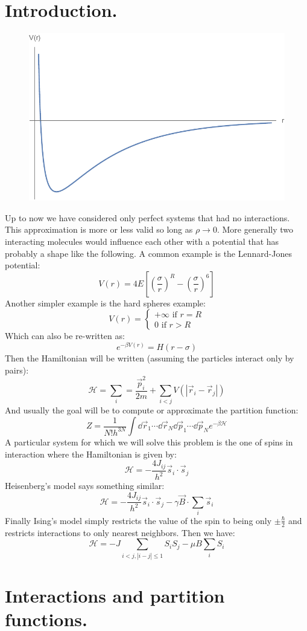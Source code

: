 \documentclass[10pt,a4paper]{book}
\begin{document}
\section{Introduction.}
\begin{figure}
\includegraphics[width = 0.3 \textwidth]{graphs/ExamplePotential}
\end{figure}
Up to now we have considered only perfect systems that had no interactions. This approximation is more or less valid so long as $\rho \to 0$. More generally two interacting molecules would influence each other with a potential that has probably a shape like the following. A common example is the Lennard-Jones potential:
\[
V(r) = 4 E \left[ \left(\frac{\sigma}{r}\right)^R - \left(\frac{\sigma}{r}\right)^6 \right]
\]
Another simpler example is the hard spheres example:
\[
V(r) = \begin{cases} +\infty \text{ if } r = R\\0 \text{ if } r > R
\end{cases}
\]
Which can also be re-written as:
\[
e^{-\beta V(r)} = H(r - \sigma)
\]
Then the Hamiltonian will be written (assuming the particles interact only by pairs):
\[
\mathcal{H} = \sum_i = \frac{\vec{p}_i^2}{2m} + \sum_{i < j} V(|\vec{r}_i - \vec{r}_j|)
\]
And usually the goal will be to compute or approximate the partition function:
\[
Z = \frac{1}{N! h^{3N}}\int \dd \vec{r}_1 \cdots \dd \vec{r}_N \dd\vec{p}_1 \cdots \dd \vec{p}_N e^{-\beta\mathcal{H}}
\]
A particular system for which we will solve this problem is the one of spins in interaction where the Hamiltonian is given by:
\[
\mathcal{H} = - \frac{4 J_{ij}}{h^2} \vec{s}_i \cdot \vec{s}_j
\]
Heisenberg's model says something similar:
\[
\mathcal{H} = - \frac{4 J_{ij}}{h^2} \vec{s}_i \cdot \vec{s}_j - \gamma \vec{B} \cdot \sum_i \vec{s}_i
\]
Finally Ising's model simply restricts the value of the spin to being only $\pm\frac{\hbar}{2}$ and restricts interactions to only nearest neighbors. Then we have:
\[
\mathcal{H} = - J \sum_{i < j, |i - j| \leq 1} S_i S_j - \mu B \sum_i S_i 
\]

\section{Interactions and partition functions.}
\end{document}
